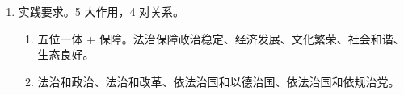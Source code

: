 \begin{enumerate}
\begin{enumerate}
          \item 坚持党对全面依法治国的领导。
          \item 坚持以人民为中心。
          \item 坚持中国特色社会主义法治道路。。
          \item 坚持依宪治国、依宪执政。。
          \item 坚持在法治轨道上推进国家治理体系和治理能力现代化。
          \item 坚持建设中国特色社会主义法治体系。。
          \item 坚持依法治国、依法执政、依法行政共同推进，法治国家、法治政府、法治社会一体建设。。
          \item 坚持全面推进科学立法、严格执法、公正司法、全民守法。。
          \item 坚持统筹推进国内法治和涉外法治。
          \item 坚持建设德才兼备的高素质法治工作队伍。
          \item 坚持抓住领导干部这个“关键少数”。。
        \end{enumerate}
  \item 实践要求。5 大作用，4 对关系。
        \begin{enumerate}
          \item 五位一体 + 保障。法治保障政治稳定、经济发展、文化繁荣、社会和谐、生态良好。
          \item 法治和政治、法治和改革、依法治国和以德治国、依法治国和依规治党。
        \end{enumerate}
\end{enumerate}
